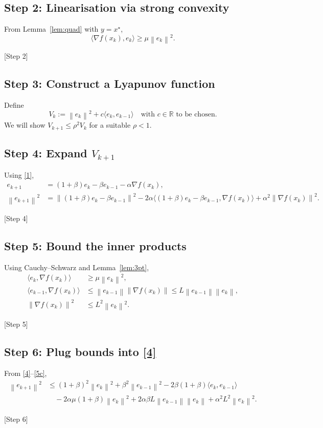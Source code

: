 \documentclass{article}
\newcommand{\R}{\mathbb{R}}
\newcommand{\norm}[1]{\left\|#1\right\|}
\begin{document}
\subsection*{Step 2: Linearisation via strong convexity}
From Lemma~\ref{lem:quad} with $y=x^\star$,
\[
\langle\nabla f(x_k),e_k\rangle\ge \mu\norm{e_k}^{2}.
\tag{2}
\]
\begin{center}
[Step 2]
\end{center}

\subsection*{Step 3: Construct a Lyapunov function}
Define
\[
V_k:=\norm{e_k}^{2}+c\langle e_k,e_{k-1}\rangle
\quad\text{with }c\in\R\text{ to be chosen.}
\tag{3}
\]
We will show $V_{k+1}\le\rho^{2}V_k$ for a suitable $\rho<1$.

\subsection*{Step 4: Expand $V_{k+1}$}
Using \eqref{1},
\[
\begin{aligned}
e_{k+1}&=(1+\beta)e_k-\beta e_{k-1}-\alpha\nabla f(x_k),\\[0.2em]
\norm{e_{k+1}}^{2}
&=\norm{(1+\beta)e_k-\beta e_{k-1}}^{2}
      -2\alpha\langle(1+\beta)e_k-\beta e_{k-1},\nabla f(x_k)\rangle
      +\alpha^{2}\norm{\nabla f(x_k)}^{2}.
\end{aligned}
\tag{4}
\]
\begin{center}
[Step 4]
\end{center}

\subsection*{Step 5: Bound the inner products}
Using Cauchy–Schwarz and Lemma~\ref{lem:3pt},
\[
\begin{aligned}
\langle e_k,\nabla f(x_k)\rangle &\ge \mu\norm{e_k}^{2},\tag{5a}\\
\langle e_{k-1},\nabla f(x_k)\rangle &\le \norm{e_{k-1}}\norm{\nabla f(x_k)}
                                         \le L\norm{e_{k-1}}\norm{e_k},\tag{5b}\\
\norm{\nabla f(x_k)}^{2} &\le L^{2}\norm{e_k}^{2}. \tag{5c}
\end{aligned}
\]
\begin{center}
[Step 5]
\end{center}

\subsection*{Step 6: Plug bounds into \eqref{4}}
From \eqref{4}–\eqref{5c},
\[
\begin{aligned}
\norm{e_{k+1}}^{2}
&\le (1+\beta)^{2}\norm{e_k}^{2}+\beta^{2}\norm{e_{k-1}}^{2}
   -2\beta(1+\beta)\langle e_k,e_{k-1}\rangle\\
&\quad -2\alpha\mu(1+\beta)\norm{e_k}^{2}
      +2\alpha\beta L \norm{e_{k-1}}\norm{e_k}
      +\alpha^{2}L^{2}\norm{e_k}^{2}.
\end{aligned}
\tag{6}
\]
\begin{center}
[Step 6]
\end{center}
\end{document}
